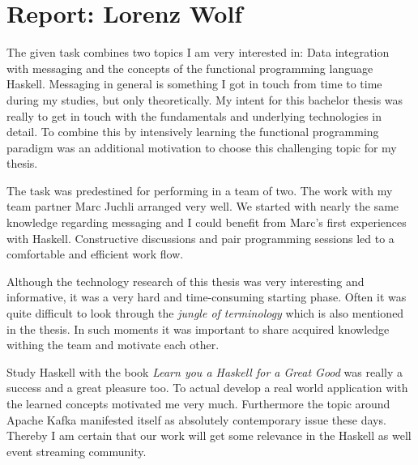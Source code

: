 \section*{Report: Lorenz Wolf}
The given task combines two topics I am very interested in: Data integration
with messaging and the concepts of the functional programming language Haskell.
Messaging in general is something I got in touch from time to time during my
studies, but only theoretically. My intent for this bachelor thesis was really to
get in touch with the fundamentals and underlying technologies in detail. To
combine this by intensively learning the functional programming paradigm was an
additional motivation to choose this challenging topic for my thesis.

The task was predestined for performing in a team of two. The work with my team
partner Marc Juchli arranged very well. We started with nearly the same
knowledge regarding messaging and I could benefit from Marc's first experiences
with Haskell. Constructive discussions and pair programming sessions led to a
comfortable and efficient work flow.

Although the technology research of this thesis was very interesting and
informative, it was a very hard and time-consuming starting phase. Often it was
quite difficult to look through the \textit{jungle of terminology} which is also
mentioned in the thesis. In such moments it was important to share acquired
knowledge withing the team and motivate each other.

Study Haskell with the book \textit{Learn you a Haskell for a Great Good} was
really a success and a great pleasure too. To actual develop a real world
application with the learned concepts motivated me very much. Furthermore
the topic around Apache Kafka manifested itself as absolutely contemporary issue
these days. Thereby I am certain that our work will get some relevance in
the Haskell as well event streaming community.



